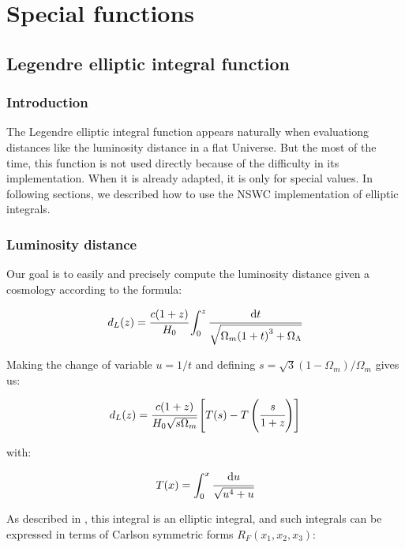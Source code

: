 \chapter{Special functions}
\label{cha:gamma}

\section{Legendre elliptic integral function}

\subsection{Introduction}

The Legendre elliptic integral function appears naturally when evaluationg
distances like the luminosity distance in a flat Universe. But the most of the
time, this function is not used directly because of the difficulty in its
implementation. When it is already adapted, it is only for special values. In
following sections, we described how to use the NSWC implementation of elliptic
integrals.

\subsection{Luminosity distance}

Our goal is to easily and precisely compute the luminosity distance given a
cosmology according to the formula:

\begin{equation}
    d_L(z)=\cfrac{c(1+z)}{H_0}\int_0^z\cfrac{{\rm{d}}{t}}{\sqrt{\Omega_m{(1+t)}^3+\Omega_\Lambda}}
\end{equation}

Making the change of variable $u=1/t$ and defining
$s=\sqrt{3}{(1-\Omega_m)/\Omega_m}$ gives us:

\begin{equation}
    d_L(z)=\cfrac{c(1+z)}{H_0\sqrt{s\Omega_m}}\left[T(s)-T\left(\cfrac{s}{1+z}\right)\right]
\end{equation}

with:

\begin{equation}
    T(x)=\int_0^x\cfrac{{\rm{d}}{u}}{\sqrt{u^4+u}}
\end{equation}

As described in \citet{Liu+11}, this integral is an elliptic integral, and such
integrals can be expressed in terms of Carlson symmetric forms
$R_F(x_1,x_2,x_3)$:

